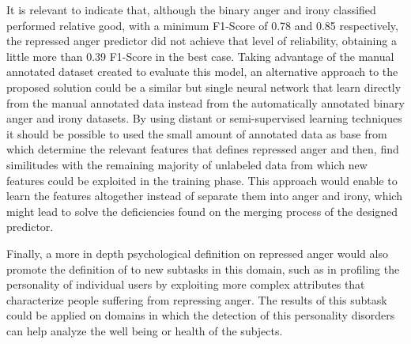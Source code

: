 It is relevant to indicate that, although the binary anger and irony classified performed relative good, with a minimum F1-Score of 0.78 and 0.85 respectively, the repressed anger predictor did not achieve that level of reliability, obtaining a little more than 0.39 F1-Score in the best case. Taking advantage of the manual annotated dataset created to evaluate this model, an alternative approach to the proposed solution could be a similar but single neural network that learn directly from the manual annotated data instead from the automatically annotated binary anger and irony datasets. By using distant or semi-supervised learning techniques it should be possible to used the small amount of annotated data as base from which determine the relevant features that defines repressed anger and then, find similitudes with the remaining majority of unlabeled data from which new features could be exploited in the training phase. This approach would enable to learn the features altogether instead of separate them into anger and irony, which might lead to solve the deficiencies found on the merging process of the designed predictor.

Finally, a more in depth psychological definition on repressed anger would also promote the definition of to new subtasks in this domain, such as in profiling the personality of individual users by exploiting more complex attributes that characterize people suffering from repressing anger. The results of this subtask could be applied on domains in which the detection of this personality disorders can help analyze the well being or health of the subjects.  